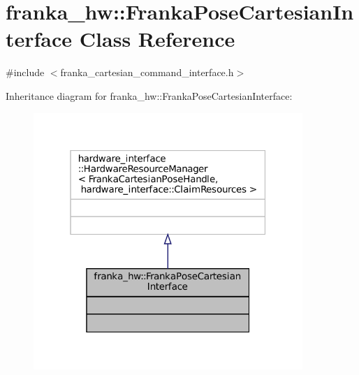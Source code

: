 \hypertarget{classfranka__hw_1_1FrankaPoseCartesianInterface}{}\section{franka\+\_\+hw\+:\+:Franka\+Pose\+Cartesian\+Interface Class Reference}
\label{classfranka__hw_1_1FrankaPoseCartesianInterface}


{\ttfamily \#include $<$franka\+\_\+cartesian\+\_\+command\+\_\+interface.\+h$>$}



Inheritance diagram for franka\+\_\+hw\+:\+:Franka\+Pose\+Cartesian\+Interface\+:
\nopagebreak
\begin{figure}[H]
\begin{center}
\leavevmode
\includegraphics[width=289pt]{classfranka__hw_1_1FrankaPoseCartesianInterface__inherit__graph}
\end{center}
\end{figure}


